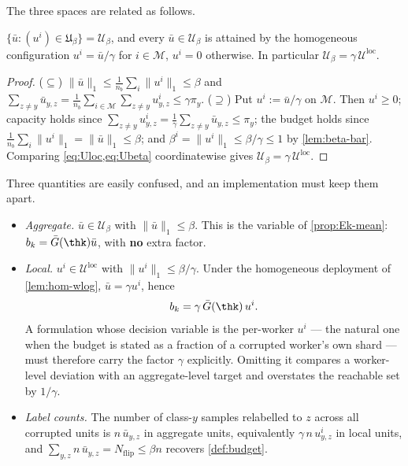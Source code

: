 The three spaces are related as follows.

\begin{lemma}
\label{lem:hom-wlog}
$\{\bar u:(u^i)\in\mathfrak{U}_\beta\}=\mathcal{U}_\beta$, and every $\bar u\in\mathcal{U}_\beta$ is attained by the homogeneous configuration $u^i=\bar u/\gamma$ for $i\in\mathcal{M}$, $u^i=0$ otherwise. In particular $\mathcal{U}_\beta=\gamma\,\mathcal{U}^{\mathrm{loc}}$.
\end{lemma}
\begin{proof}
($\subseteq$) $\|\bar u\|_1\le\tfrac1{n_b}\sum_i\|u^i\|_1\le\beta$ and $\sum_{z\neq y}\bar u_{y,z}=\tfrac1{n_b}\sum_{i\in\mathcal{M}}\sum_{z\neq y}u^i_{y,z}\le\gamma\pi_y$.
($\supseteq$) Put $u^i:=\bar u/\gamma$ on $\mathcal{M}$. Then $u^i\ge0$; capacity holds since $\sum_{z\neq y}u^i_{y,z}=\tfrac1\gamma\sum_{z\neq y}\bar u_{y,z}\le\pi_y$; the budget holds since $\tfrac1{n_b}\sum_i\|u^i\|_1=\|\bar u\|_1\le\beta$; and $\beta^i=\|u^i\|_1\le\beta/\gamma\le1$ by \cref{lem:beta-bar}. Comparing \cref{eq:Uloc,eq:Ubeta} coordinatewise gives $\mathcal{U}_\beta=\gamma\,\mathcal{U}^{\mathrm{loc}}$.
\end{proof}

\begin{remark}
\label{rem:units}
Three quantities are easily confused, and an implementation must keep them apart.
\begin{itemize}[noitemsep,leftmargin=*]
\item \emph{Aggregate.} $\bar u\in\mathcal{U}_\beta$ with $\|\bar u\|_1\le\beta$. This is the
variable of \cref{prop:Ek-mean}: $b_k=\bar G(\thk)\bar u$, with \textbf{no} extra factor.
\item \emph{Local.} $u^i\in\mathcal{U}^{\mathrm{loc}}$ with $\|u^i\|_1\le\beta/\gamma$. Under the
homogeneous deployment of \cref{lem:hom-wlog}, $\bar u=\gamma u^i$, hence
\begin{equation}
b_k=\gamma\,\bar G(\thk)\,u^i .
\label{eq:local-scope}
\end{equation}
A formulation whose decision variable is the per-worker $u^i$ --- the natural one when the
budget is stated as a fraction of a corrupted worker's own shard --- must therefore carry the
factor $\gamma$ explicitly. Omitting it compares a worker-level deviation with an
aggregate-level target and overstates the reachable set by $1/\gamma$.
\item \emph{Label counts.} The number of class-$y$ samples relabelled to $z$ across all corrupted
units is $n\,\bar u_{y,z}$ in aggregate units, equivalently $\gamma\,n\,u^i_{y,z}$ in local
units, and $\sum_{y,z}n\,\bar u_{y,z}=N_{\mathrm{flip}}\le\beta n$ recovers \cref{def:budget}.
\end{itemize}
\end{remark}

